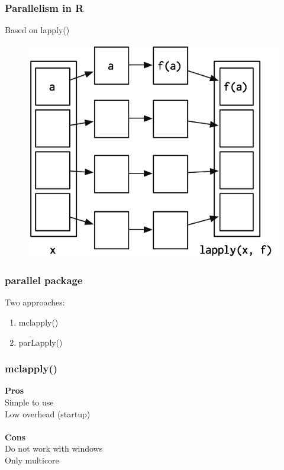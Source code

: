 \documentclass{beamer}
\begin{document}
\begin{frame}
	\frametitle{Parallelism in R}
	Based on lapply()
	\begin{figure}[t]
		\begin{center}
			\includegraphics[scale=0.8]{figures/lapply}	\\
		\end{center}
	\end{figure}
\end{frame}

\begin{frame}
	\frametitle{parallel package}
	Two approaches:
	\begin{center}
		\begin{enumerate}
			\item mclapply()
			\item parLapply()
		\end{enumerate}
	\end{center}
\end{frame}

\begin{frame}
	\frametitle{mclapply()}
	\begin{center}
		\textbf{Pros} \\
		Simple to use \\
		Low overhead (startup) \\~\\
		
		\textbf{Cons} \\
		Do not work with windows \\
		Only multicore \\
	\end{center}
\end{frame}
\end{document}
